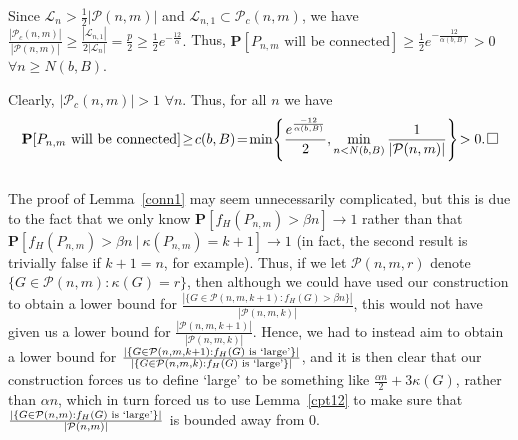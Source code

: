 \documentclass{article}
\newtheorem{Proof of Theorem}{Proof of Theorem}
\begin{document}
Since $\mathcal{L}_{n} > \frac{1}{2} |\mathcal{P}(n,m)|$ and 
$\mathcal{L}_{n,1} \subset \mathcal{P}_{c} (n,m)$,
we have 
$
\frac{|\mathcal{P}_{c}(n,m)|} {|\mathcal{P}(n,m)|} \geq 
\frac{|\mathcal{L}_{n,1}|}{2|\mathcal{L}_{n}|}
= \frac{p}{2} \geq \frac{1}{2}e^{-\frac{12}{\alpha}}.
$
Thus, 
$\mathbf{P}[P_{n,m} \textrm{ will be connected}] 
\geq \frac{1}{2}e^{-\frac{12}{\alpha (b,B)}} > 0$
~$\forall n \geq N(b,B)$.

Clearly, $|\mathcal{P}_{c}(n,m)| > 1$ $\forall n$.
Thus, for all $n$ we have
\begin{displaymath}
\mathbf{P}[P_{n,m} \textrm{ will be connected}] \!\geq\! c(b,B) \!=\! 
\min 
\!\left\{ 
\frac{e^{\frac{-12}{\alpha (b,B)}}}{2}, \min_{n<N(b,B)} \frac{1}{|\mathcal{P}(n,m)|} 
\right\}\! > 0.\!~
\setlength{\unitlength}{.25cm}
\begin{picture}(1,1)
\put(0,0){\line(1,0){1}}
\put(0,0){\line(0,1){1}}
\put(1,1){\line(-1,0){1}}
\put(1,1){\line(0,-1){1}}
\end{picture}
\end{displaymath} \\















The proof of Lemma~\ref{conn1} may seem unnecessarily complicated,
but this is due to the fact that we only know
$\mathbf{P}[f_{H}(P_{n,m})>\beta n] \to 1$
rather than that
$\mathbf{P}[f_{H}(P_{n,m})>\beta n~|~\kappa(P_{n,m})=k+1] \to1$
(in fact,
the second result is trivially false if $k+1=n$,
for example).
Thus,
if we let $\mathcal{P}(n,m,r)$ denote~$\{ G \in \mathcal{P}(n,m) : \kappa (G) = r \}$,
then although we could have used our construction to obtain a lower bound for
$\frac{ | \{ G \in \mathcal{P}(n,m,k+1) : f_{H}(G)>\beta n \} |}
{|\mathcal{P}(n,m,k)|}$,
this would not have given us a lower bound for 
$\frac{|\mathcal{P}(n,m,k+1)|}{|\mathcal{P}(n,m,k)|}$.
Hence,
we had to instead aim to obtain a lower bound for
$\frac{ | \{ G \in \mathcal{P}(n,m,k+1) : f_{H}(G) \textrm{ \scriptsize{is `large'}} \} |}
{ | \{ G \in \mathcal{P}(n,m,k) : f_{H}(G) \textrm{ \scriptsize{is `large'}} \} |}$,
and it is then clear that our construction forces us to define `large' to be something like
$\frac{\alpha n}{2} + 3 \kappa (G)$,
rather than $\alpha n$,
which in turn forced us to use Lemma~\ref{cpt12}
to make sure that 
$\frac{ | \{ G \in \mathcal{P}(n,m) : f_{H}(G) \textrm{ \scriptsize{is `large'}} \} |}
{|\mathcal{P}(n,m)|}$
is bounded away from $0$. \\
\\
\\
\end{document}

